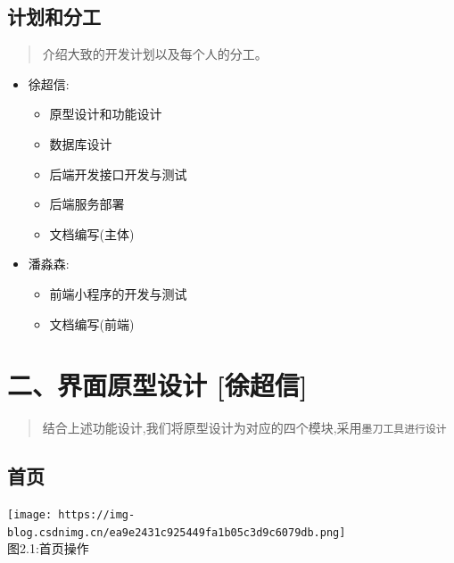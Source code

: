 \documentclass[
]{article}
\begin{document}
\hypertarget{ux8ba1ux5212ux548cux5206ux5de5}{%
\subsection{计划和分工}\label{ux8ba1ux5212ux548cux5206ux5de5}}

\begin{quote}
介绍大致的开发计划以及每个人的分工。
\end{quote}

\begin{itemize}
\item
  徐超信:

  \begin{itemize}
  \item
    原型设计和功能设计
  \item
    数据库设计
  \item
    后端开发接口开发与测试
  \item
    后端服务部署
  \item
    文档编写(主体)
  \end{itemize}
\item
  潘淼森:

  \begin{itemize}
  \item
    前端小程序的开发与测试
  \item
    文档编写(前端)
  \end{itemize}
\end{itemize}

\hypertarget{ux4e8cux754cux9762ux539fux578bux8bbeux8ba1-ux5f90ux8d85ux4fe1}{%
\section{二、界面原型设计
{[}徐超信{]}}\label{ux4e8cux754cux9762ux539fux578bux8bbeux8ba1-ux5f90ux8d85ux4fe1}}

\begin{quote}
结合上述功能设计,我们将原型设计为对应的四个模块,采用\texttt{墨刀工具进行设计}
\end{quote}

\hypertarget{ux9996ux9875-2}{%
\subsection{首页}\label{ux9996ux9875-2}}

\texttt{[image: https://img-blog.csdnimg.cn/ea9e2431c925449fa1b05c3d9c6079db.png]}\\
图2.1:首页操作
\end{document}
